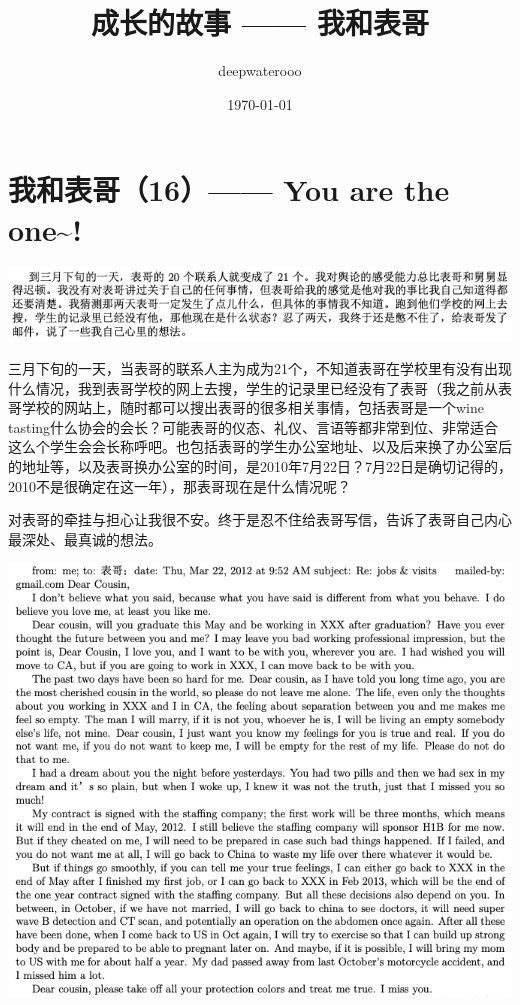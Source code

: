 \documentclass[9pt, b5paper]{article}
\author{deepwaterooo}
\date{\today}
\title{成长的故事 —— 我和表哥}
\begin{document}
\maketitle
\tableofcontents


\section{我和表哥（16）—— You are the one\textasciitilde{}!}
\label{sec:orgc97efa4}

\begin{center}
\includegraphics[width=.9\linewidth]{./pic/p1p115-1.png}
\end{center}

三月下旬的一天，当表哥的联系人主为成为21个，不知道表哥在学校里有没有出现什么情况，我到表哥学校的网上去搜，学生的记录里已经没有了表哥（我之前从表哥学校的网站上，随时都可以搜出表哥的很多相关事情，包括表哥是一个wine tasting什么协会的会长？可能表哥的仪态、礼仪、言语等都非常到位、非常适合这么个学生会会长称呼吧。也包括表哥的学生办公室地址、以及后来换了办公室后的地址等，以及表哥换办公室的时间，是2010年7月22日？7月22日是确切记得的，2010不是很确定在这一年），那表哥现在是什么情况呢？

对表哥的牵挂与担心让我很不安。终于是忍不住给表哥写信，告诉了表哥自己内心最深处、最真诚的想法。 

\begin{center}
\includegraphics[width=.9\linewidth]{./pic/p1p116.png}
\end{center}
\end{document}
